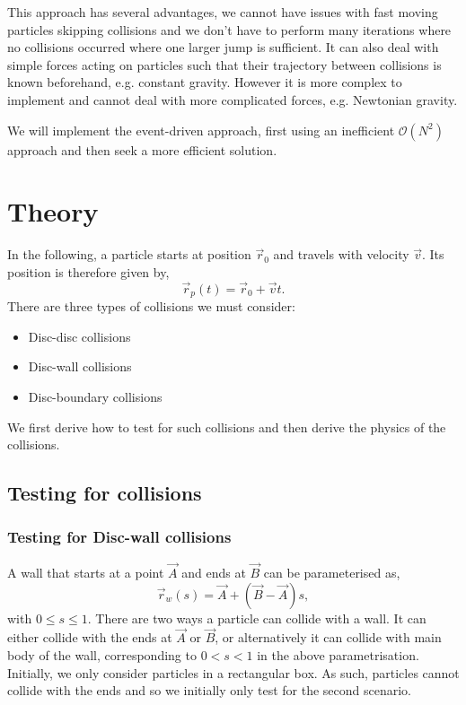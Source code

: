 \documentclass{article}
\begin{document}
This approach has several advantages, we cannot have issues with fast moving particles skipping collisions and we don't have to perform many iterations where no collisions occurred where one larger jump is sufficient. It can also deal with simple forces acting on particles such that their trajectory between collisions is known beforehand, e.g. constant gravity. However it is more complex to implement and cannot deal with more complicated forces, e.g. Newtonian gravity.

We will implement the event-driven approach, first using an inefficient $\mathcal{O}(N^2)$ approach and then seek a more efficient solution.

\section{Theory}

In the following, a particle starts at position $\vec{r}_0$ and travels with velocity $\vec{v}$. Its position is therefore given by,
\begin{equation}
    \vec{r}_p(t)
    =
    \vec{r}_0 + \vec{v}t.
\end{equation}
There are three types of collisions we must consider:
\begin{itemize}
    \item Disc-disc collisions
    \item Disc-wall collisions
    \item Disc-boundary collisions
\end{itemize}
We first derive how to test for such collisions and then derive the physics of the collisions.

\subsection{Testing for collisions}

\subsubsection{Testing for Disc-wall collisions}
A wall that starts at a point $\vec{A}$ and ends at $\vec{B}$ can be parameterised as,
\begin{equation}
    \vec{r}_w(s)
    =
    \vec{A} + (\vec{B} - \vec{A}) s,
\end{equation}
with $0 \leq s \leq 1$. There are two ways a particle can collide with a wall. It can either collide with the ends at $\vec{A}$ or $\vec{B}$, or alternatively it can collide with main body of the wall, corresponding to $0 < s < 1$ in the above parametrisation. Initially, we only consider particles in a rectangular box. As such, particles cannot collide with the ends and so we initially only test for the second scenario.
\end{document}
